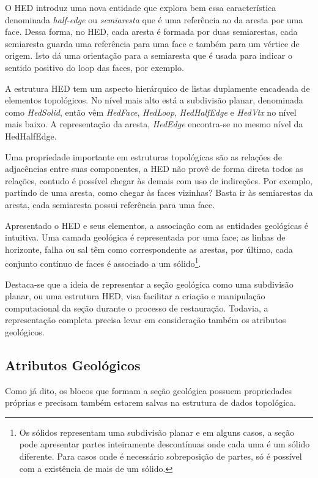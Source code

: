 O HED introduz uma nova entidade que explora bem essa característica denominada \textit{half-edge} ou \textit{semiaresta} que é uma referência ao  da aresta por uma face. Dessa forma, no HED, cada aresta é formada por duas semiarestas, cada semiaresta guarda uma referência para uma face e também para um vértice de origem. Isto dá uma orientação para a semiaresta que é usada para indicar o sentido positivo do loop das faces, por exemplo.

A estrutura HED tem um aspecto hierárquico de listas duplamente encadeada de elementos topológicos. No nível mais alto está a subdivisão planar, denominada como \textit{HedSolid}, então vêm \textit{HedFace}, \textit{HedLoop}, \textit{HedHalfEdge} e \textit{HedVtx} no nível mais baixo. A representação da aresta, \textit{HedEdge} encontra-se no mesmo nível da HedHalfEdge.

Uma propriedade importante em estruturas topológicas são as relações de adjacências entre suas componentes, a HED não provê de forma direta todos as relações, contudo é possível chegar às demais com uso de indireções. Por exemplo, partindo de uma aresta, como chegar às faces vizinhas? Basta ir às semiarestas da aresta, cada semiaresta possui referência para uma face.

Apresentado o HED e seus elementos, a associação com as entidades geológicas é intuitiva. Uma camada geológica é representada por uma face; as linhas de horizonte, falha ou sal têm como correspondente as arestas, por último, cada conjunto contínuo de faces é associado a um sólido\footnote{Os sólidos representam uma subdivisão planar e em alguns casos, a seção pode apresentar partes inteiramente descontínuas onde cada uma é um sólido diferente. Para casos onde é necessário sobreposição de partes, só é possível com a existência de mais de um sólido.}.

Destaca-se que a ideia de representar a seção geológica como uma subdivisão planar, ou uma estrutura HED, visa facilitar a criação e manipulação computacional da seção durante o processo de restauração. Todavia, a representação completa precisa levar em consideração também os atributos geológicos.

\subsection{Atributos Geológicos}

Como já dito, os blocos que formam a seção geológica possuem propriedades próprias e precisam também estarem salvas na estrutura de dados topológica.

